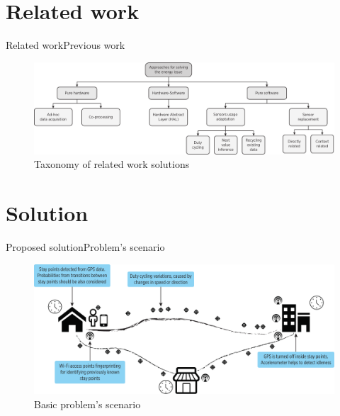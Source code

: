 \documentclass[8pt,xcolor={dvipsnames},handout]{beamer}
\begin{document}
\section{Related work}
\begin{frame}{Related work}{Previous work}
\begin{figure}
  \centering
  \includegraphics[width=\textwidth]{../../../resources/images/vectors/approaches-taxonomy}
  \caption{Taxonomy of related work solutions}
  \label{fig:taxonomy}
\end{figure}
\end{frame}

\section{Solution}
\begin{frame}{Proposed solution}{Problem's scenario}
\begin{figure}
  \centering
  \includegraphics[width=\textwidth]{vectors/scenario}
  \caption{Basic problem's scenario}
  \label{fig:scenario}
\end{figure}
\end{frame}
\end{document}
